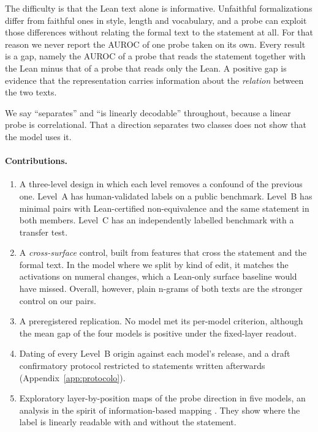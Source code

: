 \documentclass[10pt]{article}
\begin{document}
The difficulty is that the Lean text alone is informative. Unfaithful formalizations differ from faithful ones in
style, length and vocabulary, and a probe can exploit those differences without relating the formal text to the
statement at all. For that reason we never report the AUROC of one probe taken on its own. Every result is a gap,
namely the AUROC of a probe that reads the statement together with the Lean minus that of a probe that reads only
the Lean. A positive gap is evidence that the representation carries information about the \emph{relation} between
the two texts.

We say ``separates'' and ``is linearly decodable'' throughout, because a linear probe is correlational. That a
direction separates two classes does not show that the model uses it.

\paragraph{Contributions.}
\begin{enumerate}
\item A three-level design in which each level removes a confound of the previous one. Level~A has human-validated
labels on a public benchmark. Level~B has minimal pairs with Lean-certified non-equivalence and the same statement
in both members. Level~C has an independently labelled benchmark with a transfer test.
\item A \emph{cross-surface} control, built from features that cross the statement and the formal text. In the
model where we split by kind of edit, it matches the activations on numeral changes, which a Lean-only surface
baseline would have missed. Overall, however, plain n-grams of both texts are the stronger control on our pairs.
\item A preregistered replication. No model met its per-model criterion, although the mean gap of the four models
is positive under the fixed-layer readout.
\item Dating of every Level~B origin against each model's release, and a draft confirmatory protocol restricted to
statements written afterwards (Appendix~\ref{app:protocolo}).
\item Exploratory layer-by-position maps of the probe direction in five models, an analysis in the spirit of
information-based mapping \citep{searchlight}. They show where the label is linearly readable with and without the
statement.
\end{enumerate}
\end{document}
